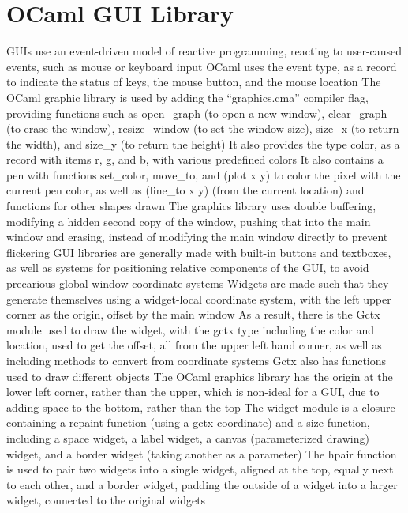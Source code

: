 \documentclass[11 pt, twoside]{article}
\newenvironment{outline*}
{
	\begin{outline}[enumerate]
	}
	{\end{outline}
}
\begin{document}
\section{OCaml GUI Library}
\begin{outline*}
\1 GUIs use an event-driven model of reactive programming, reacting to user-caused events, such as mouse or keyboard input
	\2 OCaml uses the event type, as a record to indicate the status of keys, the mouse button, and the mouse location
\1 The OCaml graphic library is used by adding the ``graphics.cma'' compiler flag, providing functions such as open\_graph (to open a new window), clear\_graph (to erase the window), resize\_window (to set the window size), size\_x (to return the width), and size\_y (to return the height)
	\2 It also provides the type color, as a record with items r, g, and b, with various predefined colors
	\2 It also contains a pen with functions set\_color, move\_to, and (plot x y) to color the pixel with the current pen color, as well as (line\_to x y) (from the current location) and functions for other shapes drawn
	\2 The graphics library uses double buffering, modifying a hidden second copy of the window, pushing that into the main window and erasing, instead of modifying the main window directly to prevent flickering
\1 GUI libraries are generally made with built-in buttons and textboxes, as well as systems for positioning relative components of the GUI, to avoid precarious global window coordinate systems
	 \2 Widgets are made such that they generate themselves using a widget-local coordinate system, with the left upper corner as the origin, offset by the main window
	 	\3 As a result, there is the Gctx module used to draw the widget, with the gctx type including the color and location, used to get the offset, all from the upper left hand corner, as well as including methods to convert from coordinate systems
	 		\4 Gctx also has functions used to draw different objects
	 	\3 The OCaml graphics library has the origin at the lower left corner, rather than the upper, which is non-ideal for a GUI, due to adding space to the bottom, rather than the top
	 \2 The widget module is a closure containing a repaint function (using a gctx coordinate) and a size function, including a space widget, a label widget, a canvas (parameterized drawing) widget, and a border widget (taking another as a parameter)
	 	\3 The hpair function is used to pair two widgets into a single widget, aligned at the top, equally next to each other, and a border widget, padding the outside of a widget into a larger widget, connected to the original widgets

\end{outline*}
\end{document}
